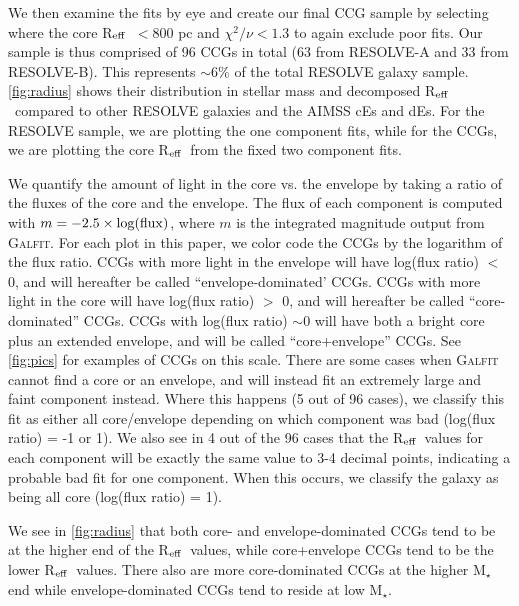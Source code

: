 \documentclass[iop,apj]{emulateapj}
\newcommand{\Reff}{R$_{\rm eff}$}
\begin{document}
We then examine the fits by eye and create our final CCG sample by selecting where the core \Reff\ $< 800$ pc and $\chi^2/\nu < 1.3$ to again exclude poor fits. Our sample is thus comprised of 96 CCGs in total (63 from RESOLVE-A and 33 from RESOLVE-B). This represents $\sim6$\% of the total RESOLVE galaxy sample. \autoref{fig:radius} shows their distribution in stellar mass and decomposed \Reff\ compared to other RESOLVE galaxies and the AIMSS cEs and dEs. For the RESOLVE sample, we are plotting the one component fits, while for the CCGs, we are plotting the core \Reff\ from the fixed two component fits. 

We quantify the amount of light in the core vs. the envelope by taking a ratio of the fluxes of the core and the envelope. The flux of each component is computed with $m = -2.5 \times \log({\rm flux})$, where $m$ is the integrated magnitude output from \textsc{Galfit}. For each plot in this paper, we color code the CCGs by the logarithm of the flux ratio. CCGs with more light in the envelope will have log(flux ratio) $<$ 0, and will hereafter be called ``envelope-dominated' CCGs. CCGs with more light in the core will have log(flux ratio) $>$ 0, and will hereafter be called ``core-dominated'' CCGs. CCGs with log(flux ratio) $\sim 0$ will have both a bright core plus an extended envelope, and will be called ``core+envelope'' CCGs. See \autoref{fig:pics} for examples of CCGs on this scale. There are some cases when \textsc{Galfit} cannot find a core or an envelope, and will instead fit an extremely large and faint component instead. Where this happens (5 out of 96 cases), we classify this fit as either all core/envelope depending on which component was bad (log(flux ratio) = -1 or 1). We also see in 4 out of the 96 cases that the \Reff\ values for each component will be exactly the same value to 3-4 decimal points, indicating a probable bad fit for one component. When this occurs, we classify the galaxy as being all core (log(flux ratio) = 1).

We see in \autoref{fig:radius} that both core- and envelope-dominated CCGs tend to be at the higher end of the \Reff\ values, while core+envelope CCGs tend to be the lower \Reff\ values. There also are more core-dominated CCGs at the higher M$_{\star}$ end while envelope-dominated CCGs tend to reside at low M$_{\star}$.
\end{document}
